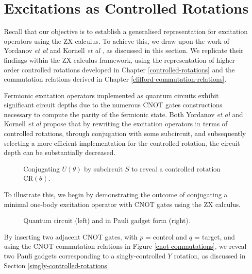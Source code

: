 \section{Excitations as Controlled Rotations}%
\label{operator-controlled-rotations}

Recall that our objective is to establish a generalised representation for excitation operators using the ZX calculus. To achieve this, we draw upon the work of Yordanov \textit{et al} \cite{Yordanov2020} and Kornell \textit{et al} \cite{Kornell2023}, as discussed in this section. We replicate their findings within the ZX calculus framework, using the representation of higher-order controlled rotations developed in Chapter \ref{controlled-rotations} and the commutation relations derived in Chapter \ref{clifford-commutation-relations}. 

Fermionic excitation operators implemented as quantum circuits exhibit significant circuit depths due to the numerous CNOT gates constructions necessary to compute the parity of the fermionic state. Both Yordanov \textit{et al} and Kornell \textit{et al} propose that by rewriting the excitation operators in terms of controlled rotations, through conjugation with some subcircuit, and subsequently selecting a more efficient implementation for the controlled rotation, the circuit depth can be substantially decreased.

\begin{figure}[H]
    \centering
    \caption{Conjugating $U(\theta)$ by subcircuit $S$ to reveal a controlled rotation CR$(\theta)$.}
\end{figure}

To illustrate this, we begin by demonstrating the outcome of conjugating a minimal one-body excitation operator with CNOT gates using the ZX calculus.

\begin{figure}[H]
    \centering
    \caption{Quantum circuit (left) and in Pauli gadget form (right).}
    \label{minimal-one-body}
\end{figure}

By inserting two adjacent CNOT gates, with $p$ = control and $q$ = target, and using the CNOT commutation relations in Figure \ref{cnot-commutations}, we reveal two Pauli gadgets corresponding to a singly-controlled $Y$ rotation, as discussed in Section \ref{singly-controlled-rotations}.


